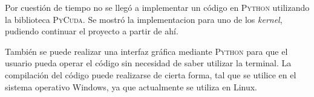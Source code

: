 
Por cuestión de tiempo no se llegó a implementar un código en \textsc{Python} utilizando la biblioteca \textsc{PyCuda}. Se mostró la implementacion para uno de los \textit{kernel}, pudiendo continuar el proyecto a partir de ahí. 

También se puede realizar una interfaz gráfica mediante \textsc{Python} para que el usuario pueda operar el código sin necesidad de saber utilizar la terminal. La compilación del código puede realizarse de cierta forma, tal que se utilice en el sistema operativo Windows, ya que actualmente se utiliza en Linux. 